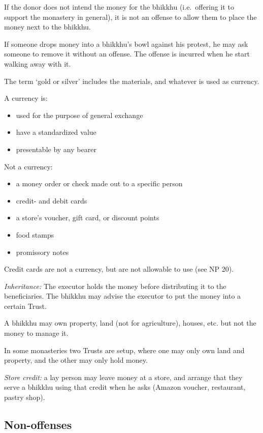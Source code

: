 If the donor does not intend the money for the bhikkhu (i.e.~offering it
to support the monastery in general), it is not an offense to allow them
to place the money next to the bhikkhu.

If someone drops money into a bhikkhu's bowl against his protest, he may
ask someone to remove it without an offense. The offense is incurred
when he start walking away with it.

The term `gold or silver' includes the materials, and whatever is used
as currency.

\clearpage

A currency is:

\begin{itemize}
\tightlist
\item
  used for the purpose of general exchange
\item
  have a standardized value
\item
  presentable by any bearer
\end{itemize}

Not a currency:

\begin{itemize}
\tightlist
\item
  a money order or check made out to a specific person
\item
  credit- and debit cards
\item
  a store's voucher, gift card, or discount points
\item
  food stamps
\item
  promissory notes
\end{itemize}

Credit cards are not a currency, but are not allowable to use (see NP
20).

\emph{Inheritance:} The executor holds the money before distributing it
to the beneficiaries. The bhikkhu may advise the executor to put the
money into a certain Trust.

A bhikkhu may own property, land (not for agriculture), houses, etc. but
not the money to manage it.

In some monasteries two Trusts are setup, where one may only own land
and property, and the other may only hold money.

\emph{Store credit:} a lay person may leave money at a store, and
arrange that they serve a bhikkhu using that credit when he asks (Amazon
voucher, restaurant, pastry shop).

\subsection{Non-offenses}

